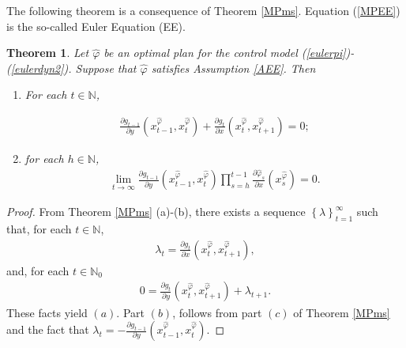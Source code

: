 \documentclass[3p]{elsarticle}
\newcommand{\nat}{\mathbb N_0}
\newcommand{\natu}{\mathbb N}
\newtheorem{thm}{Theorem}
\begin{document}
	
	The following theorem is a consequence of Theorem \ref{MPms}. Equation (\ref{MPEE}) is the so-called Euler Equation (EE).
	
	
	
	
	\begin{thm} Let $\hat\varphi$ be an optimal plan for the control model (\ref{eulerpi})-(\ref{eulerdyn2}). Suppose that $\hat\varphi$ satisfies Assumption \ref{AEE}. Then 
		
		
		
		\begin{enumerate}
			\item[(a)] For each $t\in\natu$,
			
			
			\begin{align}\label{MPEE}
			\displaystyle\frac{\partial g_{t-1}}{\partial y}\left( x_{t-1}^{\hat{\varphi}},x_{t}^{\hat\varphi}\right) +\displaystyle\frac{\partial g_{t}}{\partial x}\left( x_t^{\hat{\varphi}},x_{t+1}^{\hat\varphi}\right)=0;
			\end{align}
			
			\item[(b)]for each $h\in\natu$,
			\begin{align}\label{TCEE}
			\lim_{t\to\infty}\frac{\partial g_{t-1}}{\partial y}\left( x_{t-1}^{\hat{\varphi}},x_{t}^{\hat\varphi}\right)\prod_{s=h}^{t-1}\frac{\partial \hat\varphi_s}{\partial x}(x_s^{\hat\varphi})=0.
			\end{align}
		\end{enumerate}
		
	\end{thm}
	
	\begin{proof}
		
		From Theorem \ref{MPms} (a)-(b), there exists a sequence $\left\lbrace\lambda \right\rbrace_{t=1}^\infty $ such that, for each $t\in\natu$,
		\begin{align*}
		\lambda_{t}=\frac{\partial g_t}{\partial x}(x_t^{\hat\varphi},x_{t+1}^{\hat\varphi}),
		\end{align*}
		and, for each $t\in\nat$
		\begin{align*}
		0=\frac{\partial g_t}{\partial y}(x_t^{\hat\varphi},x_{t+1}^{\hat\varphi})+\lambda_{t+1}.
		\end{align*}
		These facts yield $(a)$. 
		Part $(b)$, follows from part $(c)$ of Theorem \ref{MPms} and the fact that $\displaystyle\lambda_t=-\frac{\partial g_{t-1}}{\partial y}( x_{t-1}^{\hat{\varphi}},x_{t}^{\hat\varphi})$.
	\end{proof}
	
\end{document}
